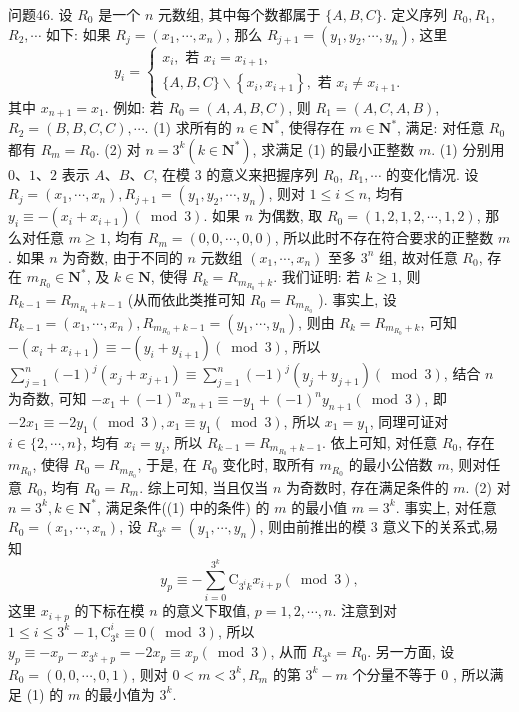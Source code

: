 问题46. 设 $R_0$ 是一个 $n$ 元数组, 其中每个数都属于 $\{A, B, C\}$. 定义序列 $R_0, R_1$, $R_2, \cdots$ 如下: 如果 $R_j=\left(x_1, \cdots, x_n\right)$, 那么 $R_{j+1}=\left(y_1, y_2, \cdots, y_n\right)$, 这里
$$
y_i=\left\{\begin{array}{l}
x_i, \text { 若 } x_i=x_{i+1}, \\
\{A, B, C\} \backslash\left\{x_i, x_{i+1}\right\}, \text { 若 } x_i \neq x_{i+1} .
\end{array}\right.
$$
其中 $x_{n+1}=x_1$. 例如: 若 $R_0=(A, A, B, C)$, 则 $R_1=(A, C, A, B)$, $R_2=(B, B, C, C), \cdots$.
(1) 求所有的 $n \in \mathbf{N}^*$, 使得存在 $m \in \mathbf{N}^*$, 满足: 对任意 $R_0$ 都有 $R_m=R_0$.
(2) 对 $n=3^k\left(k \in \mathbf{N}^*\right)$, 求满足 (1) 的最小正整数 $m$.
(1) 分别用 $0 、 1 、 2$ 表示 $A 、 B 、 C$, 在模 3 的意义来把握序列 $R_0$, $R_1, \cdots$ 的变化情况.
设 $R_j=\left(x_1, \cdots, x_n\right), R_{j+1}=\left(y_1, y_2, \cdots, y_n\right)$, 则对 $1 \leqslant i \leqslant n$, 均有 $y_i \equiv-\left(x_i+x_{i+1}\right)(\bmod 3)$.
如果 $n$ 为偶数, 取 $R_0=(1,2,1,2, \cdots, 1,2)$, 那么对任意 $m \geqslant 1$, 均有 $R_m=(0,0, \cdots, 0,0)$, 所以此时不存在符合要求的正整数 $m$. 如果 $n$ 为奇数, 由于不同的 $n$ 元数组 $\left(x_1, \cdots, x_n\right)$ 至多 $3^n$ 组, 故对任意 $R_0$, 存在 $m_{R_0} \in \mathbf{N}^*$, 及 $k \in \mathbf{N}$, 使得 $R_k=R_{m_{R_0}+k}$. 我们证明: 若 $k \geqslant 1$, 则 $R_{k-1}=R_{m_{R_0}+k-1}$ (从而依此类推可知 $R_0=R_{m_{R_0}}$ ).
事实上, 设 $R_{k-1}=\left(x_1, \cdots, x_n\right), R_{m_{R_0}+k-1}=\left(y_1, \cdots, y_n\right)$, 则由 $R_k= R_{m_{R_0}+k}$, 可知 $-\left(x_i+x_{i+1}\right) \equiv-\left(y_i+y_{i+1}\right)(\bmod 3)$, 所以 $\sum_{j=1}^n(-1)^j\left(x_j+\right. \left.x_{j+1}\right) \equiv \sum_{j=1}^n(-1)^j\left(y_j+y_{j+1}\right)(\bmod 3)$, 结合 $n$ 为奇数, 可知 $-x_1+(-1)^n x_{n+1} \equiv -y_1+(-1)^n y_{n+1}(\bmod 3)$, 即 $-2 x_1 \equiv-2 y_1(\bmod 3), x_1 \equiv y_1(\bmod 3)$, 所以 $x_1=y_1$, 同理可证对 $i \in\{2, \cdots, n\}$, 均有 $x_i=y_i$, 所以 $R_{k-1}=R_{m_{R_0}+k-1}$.
依上可知, 对任意 $R_0$, 存在 $m_{R_0}$, 使得 $R_0=R_{m_{R_0}}$, 于是, 在 $R_0$ 变化时, 取所有 $m_{R_0}$ 的最小公倍数 $m$, 则对任意 $R_0$, 均有 $R_0=R_m$.
综上可知, 当且仅当 $n$ 为奇数时, 存在满足条件的 $m$.
(2) 对 $n=3^k, k \in \mathbf{N}^*$, 满足条件((1) 中的条件) 的 $m$ 的最小值 $m=3^k$. 事实上, 对任意 $R_0=\left(x_1, \cdots, x_n\right)$, 设 $R_{3^k}=\left(y_1, \cdots, y_n\right)$, 则由前推出的模 3 意义下的关系式,易知
$$
y_p \equiv-\sum_{i=0}^{3^k} \mathrm{C}_{3^i k} x_{i+p}(\bmod 3),
$$
这里 $x_{i+p}$ 的下标在模 $n$ 的意义下取值, $p=1,2, \cdots, n$. 注意到对 $1 \leqslant i \leqslant 3^k-1, \mathrm{C}_{3^k}^i \equiv 0(\bmod 3)$, 所以 $y_p \equiv-x_p-x_{3^k+p}=-2 x_p \equiv x_p(\bmod 3)$, 从而 $R_{3^k}=R_0$.
另一方面, 设 $R_0=(0,0, \cdots, 0,1)$, 则对 $0<m<3^k, R_m$ 的第 $3^k-m$ 个分量不等于 0 , 所以满足 (1) 的 $m$ 的最小值为 $3^k$.


